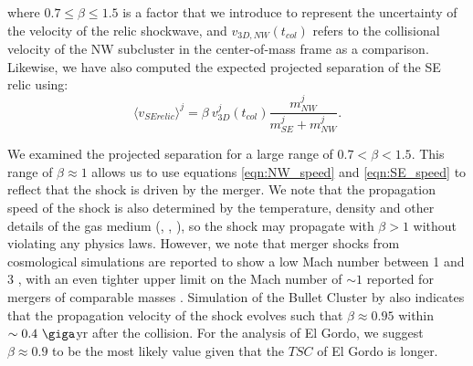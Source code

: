 where $0.7 \leq \beta \leq 1.5$ is a factor that we introduce to represent the
uncertainty of the velocity of the relic shockwave, and $v_{3D, NW}(t_{col})$ refers to the collisional velocity of
the NW subcluster in the center-of-mass frame as a comparison. 
Likewise, we have also computed the expected projected separation of the SE
relic using:  
\begin{equation}
	\label{eqn:SE_speed}
	\langle v_{SE relic} \rangle^j = \beta~v^j_{3D}(t_{col}) \frac{m^j_{NW}}{m^j_{SE} + m^j_{NW}}. 
\end{equation}
\par 
We examined the projected separation for a large range of $0.7 <\beta <
1.5$. This range of $\beta \approx 1$ allows us to use  
equations \ref{eqn:NW_speed} and \ref{eqn:SE_speed} to reflect that the
shock is driven by the merger. We note that the propagation speed of the
shock is also determined by the temperature, density and other details of
the gas medium (\citealt{Prokhorov2007}, \citealt{Springel2007},
\citealt{Milosavljevic07}), so the shock may propagate with $\beta > 1$ without violating any physics
laws. However, we note that merger shocks from cosmological
simulations are reported to show a low Mach number between 1 and 3
\citep{Bruggen2011}, with an even tighter upper limit on the Mach number of
$\sim 1$ reported for mergers of comparable masses \citep{Markevitch2007}.    
Simulation of the Bullet Cluster by \cite{Springel2007} also indicates that the
propagation velocity of the shock evolves such that $\beta \approx 0.95$ within
$\sim 0.4~\giga$yr after the collision. For the analysis of El Gordo,
we suggest $\beta \approx 0.9$ to be the most likely value given that the $TSC$ of
El Gordo is longer. 
\label{sec:positionprior}

